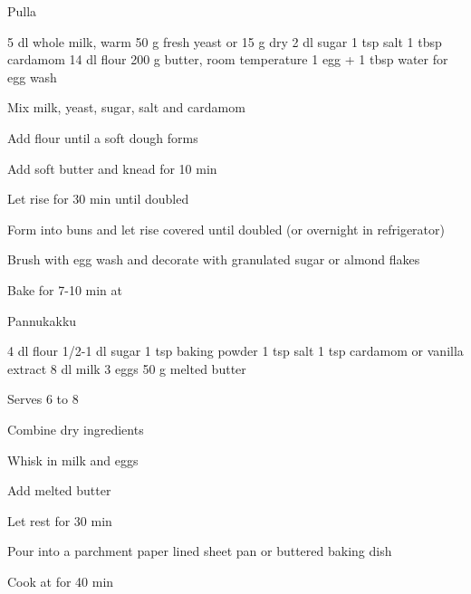 
\begin{recipe}{Pulla}{}
\begin{ingredients}
5 dl whole milk, warm
50 g fresh yeast or 15 g dry
2 dl sugar
1 tsp salt
1 tbsp cardamom
14 dl flour
200 g butter, room temperature
1 egg + 1 tbsp water for egg wash
\end{ingredients}
\nextcolumn
\begin{steps}
    \item Mix milk, yeast, sugar, salt and cardamom
    \item Add flour until a soft dough forms
    \item Add soft butter and knead for 10 min
    \item Let rise for 30 min until doubled
    \item Form into buns and let rise covered until doubled (or overnight in refrigerator)
    \item Brush with egg wash and decorate with granulated sugar or almond flakes
    \item Bake for 7-10 min at 
\end{steps}
\end{recipe}

\begin{recipe}{Pannukakku}{}
\begin{ingredients}
4 dl flour
1/2-1 dl sugar
1 tsp baking powder
1 tsp salt
1 tsp cardamom or vanilla extract
8 dl milk
3 eggs
50 g melted butter
\end{ingredients}
\nextcolumn
Serves 6 to 8
\begin{steps}
    \item Combine dry ingredients
    \item Whisk in milk and eggs
    \item Add melted butter
    \item Let rest for 30 min
    \item Pour into a parchment paper lined sheet pan or buttered baking dish
    \item Cook at  for 40 min
\end{steps}
\end{recipe}

